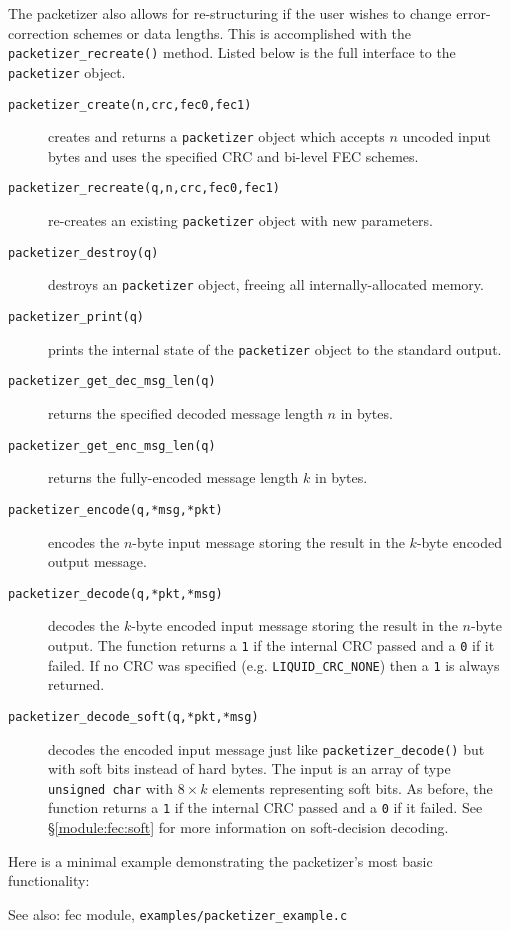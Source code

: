 
The packetizer also allows for re-structuring if the user wishes to change
error-correction schemes or data lengths.  This is accomplished with the
{\tt packetizer\_recreate()} method.
Listed below is the full interface to the {\tt packetizer} object.
%
\begin{description}
\item[{\tt packetizer\_create(n,crc,fec0,fec1)}]
    creates and returns a {\tt packetizer} object which accepts $n$
    uncoded input bytes and uses the specified CRC and bi-level FEC
    schemes.
\item[{\tt packetizer\_recreate(q,n,crc,fec0,fec1)}]
    re-creates an existing {\tt packetizer} object with new parameters.
\item[{\tt packetizer\_destroy(q)}]
    destroys an {\tt packetizer} object, freeing all
    internally-allocated memory.
\item[{\tt packetizer\_print(q)}]
    prints the internal state of the {\tt packetizer} object to the
    standard output.
\item[{\tt packetizer\_get\_dec\_msg\_len(q)}]
    returns the specified decoded message length $n$ in bytes.
\item[{\tt packetizer\_get\_enc\_msg\_len(q)}]
    returns the fully-encoded message length $k$ in bytes.
\item[{\tt packetizer\_encode(q,*msg,*pkt)}]
    encodes the $n$-byte input message storing the result in the
    $k$-byte encoded output message.
\item[{\tt packetizer\_decode(q,*pkt,*msg)}]
    decodes the $k$-byte encoded input message storing the result in the
    $n$-byte output.
    The function returns a {\tt 1} if the internal CRC passed
    and a {\tt 0} if it failed.
    If no CRC was specified (e.g. {\tt LIQUID\_CRC\_NONE}) then a {\tt 1} is
    always returned.
\item[{\tt packetizer\_decode\_soft(q,*pkt,*msg)}]
    decodes the encoded input message just like
    {\tt packetizer\_decode()}
    but with soft bits instead of hard bytes.
    The input is an array of type {\tt unsigned char} with $8 \times k$
    elements representing soft bits.
    As before, the function returns a {\tt 1} if the internal CRC passed
    and a {\tt 0} if it failed.
    See \S\ref{module:fec:soft} for more information on
    soft-decision decoding.
\end{description}
%
Here is a minimal example demonstrating the packetizer's most basic
functionality:
%

%
See also: fec module, {\tt examples/packetizer\_example.c}


